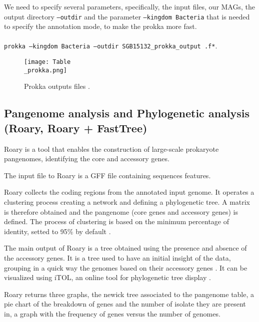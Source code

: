 \documentclass[a4paper,titlepage]{book}
\newcommand{\code}[1]{\colorbox{light-gray}{\texttt{#1}}}
\begin{document}
We need to specify several parameters, specifically, the input files, our MAGs, the output directory \code{--outdir} and the parameter \code{--kingdom Bacteria} that is needed to specify the annotation mode, to make the prokka more fast.
\\ \newline \\
\code{prokka --kingdom Bacteria --outdir SGB15132\_prokka\_output .f*}.


\begin{figure}[ht]
\centering
\texttt{[image: Table\\\_prokka.png]}
\caption{Prokka outputs files \cite{Prokka}.}
\label{fig:prokka-output}
\end{figure}

\subsection{Pangenome analysis and Phylogenetic analysis (Roary, Roary + FastTree)}

Roary is a tool that enables the construction of large-scale prokaryote pangenomes, identifying the core and accessory genes.

The input file to Roary is a GFF file containing sequences features. 

Roary collects the coding regions from the annotated input genome. It operates a clustering process creating a network and defining a phylogenetic tree. A matrix is therefore obtained and the pangenome (core genes and accessory genes) is defined.  The process of clustering is based on the minimum percentage of identity, setted to 95\% by default \cite{Roary}.

The main output of Roary is a tree obtained using the presence and absence of the accessory genes. It is a tree used to have an initial insight of the data, grouping in a quick way the genomes based on their accessory genes \cite{Roary}. It can be visualized using iTOL, an online tool for phylogenetic tree display \cite{iTOL}.

Roary returns three graphs, the newick tree associated to the pangenome table, a pie chart of the breakdown of genes and the number of isolate they are present in, a graph with the frequency of genes versus the number of genomes. \cite{Roary-outputs}
\end{document}
